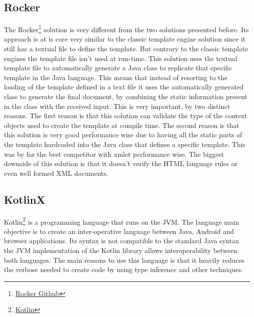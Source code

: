 
\subsection{Rocker}
\label{sec:rocker}

The Rocker\footnote{\href{https://github.com/fizzed/rocker}{Rocker Github}} solution is very different from the two solutions presented before. Its approach is at is core very similar to the classic template engine solution since it still has a textual file to define the template. But contrary to the classic template engines the template file isn't used at run-time. This solution uses the textual template file to automatically generate a Java class to replicate that specific template in the Java language. This means that instead of resorting to the loading of the template defined in a text file it uses the automatically generated class to generate the final document, by combining the static information present in the class with the received input. This is very important, by two distinct reasons. The first reason is that this solution can validate the type of the context objects used to create the template at compile time. The second reason is that this solution is very good performance wise due to having all the static parts of the template hardcoded into the Java class that defines a specific template. This was by far the best competitor with \ac{xmlet} performance wise. The biggest downside of this solution is that it doesn't verify the \ac{HTML} language rules or even well formed \ac{XML} documents.


\subsection{KotlinX}
\label{sec:kotlinx}

Kotlin\footnote{\href{https://kotlinlang.org/}{Kotlin}} is a programming language that runs on the \ac{JVM}. The language main objective is to create an inter-operative language between Java, Android and browser applications. Its syntax is not compatible to the standard Java syntax the \ac{JVM} implementation of the Kotlin library allows interoperability between both languages. The main reasons to use this language is that it heavily reduces the verbose needed to create code by using type inference and other techniques. 

